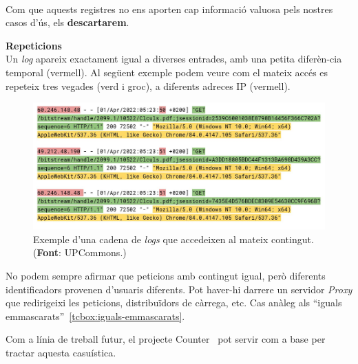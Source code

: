 \noindent \\
Com que aquests registres no ens aporten cap informació valuosa pels nostres casos d'ús, els \textbf{descartarem}.

\clearpage

\noindent
\textbf{Repeticions} \\

\noindent
Un \textit{\gls{log}} apareix exactament igual a diverses entrades, amb una petita diferèn-cia temporal (vermell).
Al següent exemple podem veure com el mateix accés es repeteix tres vegades (verd i groc), a diferents adreces \gls{IP} (vermell).

\begin{figure}[htbp]
    \centerline{\includegraphics[width=\textwidth]{figures/log-repetitions}}
    \captionsetup{justification=centering}
    \caption[Exemple d'una cadena de \textit{\gls{log}s} que accedeixen al mateix contingut.]{Exemple d'una cadena de \textit{\gls{log}s} que accedeixen al mateix contingut. (\textbf{Font}: \gls{UPCommons}.)}\label{fig:log-repetitions}
\end{figure}

\begin{tcolorbox}[colback=green!5!white, colframe=green!50!black, title=Divergència relativa]
    No podem sempre afirmar que peticions amb contingut igual, però diferents identificadors provenen d'usuaris diferents.
    Pot haver-hi darrere un servidor \textit{Proxy} que redirigeixi les peticions, distribuïdors de càrrega, etc.
    \tcblower
    Cas anàleg als ``iguals emmascarats''~\ref{tcbox:iguals-emmascarats}.
\end{tcolorbox}

\noindent
\begin{tcolorbox}[colback=blue!5!white, colframe=blue!75!black, title=Counter]
    Com a línia de treball futur, el projecte Counter~\cite{counter} pot servir com a base per tractar aquesta casuística.
\end{tcolorbox}

